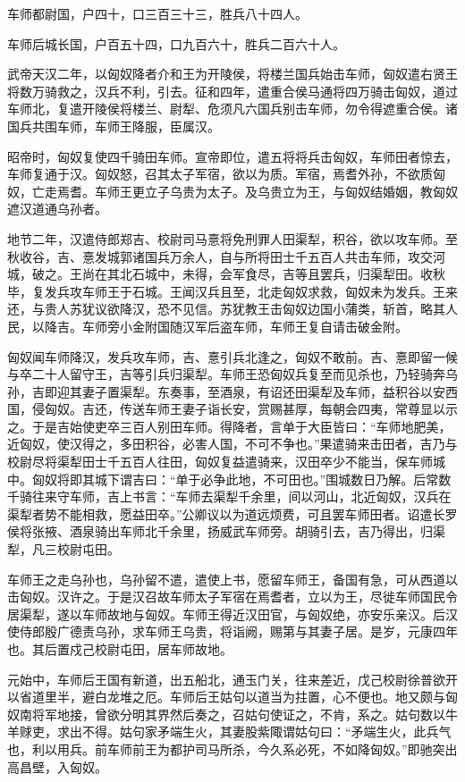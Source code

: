 \documentclass[]{article}
\begin{document}
车师都尉国，户四十，口三百三十三，胜兵八十四人。

车师后城长国，户百五十四，口九百六十，胜兵二百六十人。

武帝天汉二年，以匈奴降者介和王为开陵侯，将楼兰国兵始击车师，匈奴遣右贤王将数万骑救之，汉兵不利，引去。征和四年，遣重合侯马通将四万骑击匈奴，道过车师北，复遣开陵侯将楼兰、尉犁、危须凡六国兵别击车师，勿令得遮重合侯。诸国兵共围车师，车师王降服，臣属汉。

昭帝时，匈奴复使四千骑田车师。宣帝即位，遣五将将兵击匈奴，车师田者惊去，车师复通于汉。匈奴怒，召其太子军宿，欲以为质。军宿，焉耆外孙，不欲质匈奴，亡走焉耆。车师王更立子乌贵为太子。及乌贵立为王，与匈奴结婚姻，教匈奴遮汉道通乌孙者。

地节二年，汉遣侍郎郑吉、校尉司马憙将免刑罪人田渠犁，积谷，欲以攻车师。至秋收谷，吉、憙发城郭诸国兵万余人，自与所将田士千五百人共击车师，攻交河城，破之。王尚在其北石城中，未得，会军食尽，吉等且罢兵，归渠犁田。收秋毕，复发兵攻车师王于石城。王闻汉兵且至，北走匈奴求救，匈奴未为发兵。王来还，与贵人苏犹议欲降汉，恐不见信。苏犹教王击匈奴边国小蒲类，斩首，略其人民，以降吉。车师旁小金附国随汉军后盗车师，车师王复自请击破金附。

匈奴闻车师降汉，发兵攻车师，吉、憙引兵北逢之，匈奴不敢前。吉、憙即留一候与卒二十人留守王，吉等引兵归渠犁。车师王恐匈奴兵复至而见杀也，乃轻骑奔乌孙，吉即迎其妻子置渠犁。东奏事，至酒泉，有诏还田渠犁及车师，益积谷以安西国，侵匈奴。吉还，传送车师王妻子诣长安，赏赐甚厚，每朝会四夷，常尊显以示之。于是吉始使吏卒三百人别田车师。得降者，言单于大臣皆曰：``车师地肥美，近匈奴，使汉得之，多田积谷，必害人国，不可不争也。''果遣骑来击田者，吉乃与校尉尽将渠犁田士千五百人往田，匈奴复益遣骑来，汉田卒少不能当，保车师城中。匈奴将即其城下谓吉曰：``单于必争此地，不可田也。''围城数日乃解。后常数千骑往来守车师，吉上书言：``车师去渠犁千余里，间以河山，北近匈奴，汉兵在渠犁者势不能相救，愿益田卒。''公卿议以为道远烦费，可且罢车师田者。诏遣长罗侯将张掖、酒泉骑出车师北千余里，扬威武车师旁。胡骑引去，吉乃得出，归渠犁，凡三校尉屯田。

车师王之走乌孙也，乌孙留不遣，遣使上书，愿留车师王，备国有急，可从西道以击匈奴。汉许之。于是汉召故车师太子军宿在焉耆者，立以为王，尽徙车师国民令居渠犁，遂以车师故地与匈奴。车师王得近汉田官，与匈奴绝，亦安乐亲汉。后汉使侍郎殷广德责乌孙，求车师王乌贵，将诣阙，赐第与其妻子居。是岁，元康四年也。其后置戍己校尉屯田，居车师故地。

元始中，车师后王国有新道，出五船北，通玉门关，往来差近，戊己校尉徐普欲开以省道里半，避白龙堆之厄。车师后王姑句以道当为拄置，心不便也。地又颇与匈奴南将军地接，曾欲分明其界然后奏之，召姑句使证之，不肯，系之。姑句数以牛羊赇吏，求出不得。姑句家矛端生火，其妻股紫陬谓姑句曰：``矛端生火，此兵气也，利以用兵。前车师前王为都护司马所杀，今久系必死，不如降匈奴。''即驰突出高昌壁，入匈奴。
\end{document}
